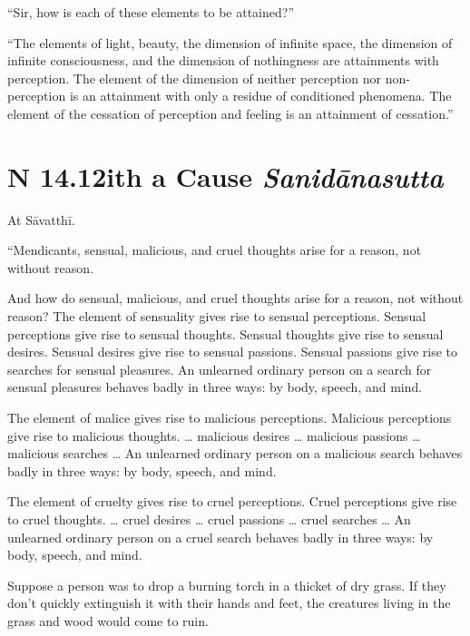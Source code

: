 \documentclass[12pt,openany]{book}%
\newcommand*{\suttatitleacronym}[1]{\smaller[2]{#1}\vspace*{.3em}}
\newcommand*{\suttatitletranslation}[1]{\linebreak{#1}}
\newcommand*{\suttatitleroot}[1]{\linebreak\smaller[2]\itshape{#1}}
\newcommand*{\tocacronym}[1]{\hspace*{-3.3em}{#1}\quad}
\newcommand*{\toctranslation}[1]{#1}
\newcommand*{\tocroot}[1]{(\textit{#1})}
\begin{document}
“Sir, how is each of these elements to be attained?” 

“The elements of light, beauty, the dimension of infinite space, the dimension of infinite consciousness, and the dimension of nothingness are attainments with perception. The element of the dimension of neither perception nor non-perception is an attainment with only a residue of conditioned phenomena. The element of the cessation of perception and feeling is an attainment of cessation.” 

%
\section*{{\suttatitleacronym SN 14.12}{\suttatitletranslation With a Cause }{\suttatitleroot Sanidānasutta}}
\addcontentsline{toc}{section}{\tocacronym{SN 14.12} \toctranslation{With a Cause } \tocroot{Sanidānasutta}}

At \textsanskrit{Sāvatthī}. 

“Mendicants, sensual, malicious, and cruel thoughts arise for a reason, not without reason. 

And how do sensual, malicious, and cruel thoughts arise for a reason, not without reason? The element of sensuality gives rise to sensual perceptions. Sensual perceptions give rise to sensual thoughts. Sensual thoughts give rise to sensual desires. Sensual desires give rise to sensual passions. Sensual passions give rise to searches for sensual pleasures. An unlearned ordinary person on a search for sensual pleasures behaves badly in three ways: by body, speech, and mind. 

The element of malice gives rise to malicious perceptions. Malicious perceptions give rise to malicious thoughts. … malicious desires … malicious passions … malicious searches … An unlearned ordinary person on a malicious search behaves badly in three ways: by body, speech, and mind. 

The element of cruelty gives rise to cruel perceptions. Cruel perceptions give rise to cruel thoughts. … cruel desires … cruel passions … cruel searches … An unlearned ordinary person on a cruel search behaves badly in three ways: by body, speech, and mind. 

Suppose a person was to drop a burning torch in a thicket of dry grass. If they don’t quickly extinguish it with their hands and feet, the creatures living in the grass and wood would come to ruin. 
\end{document}
